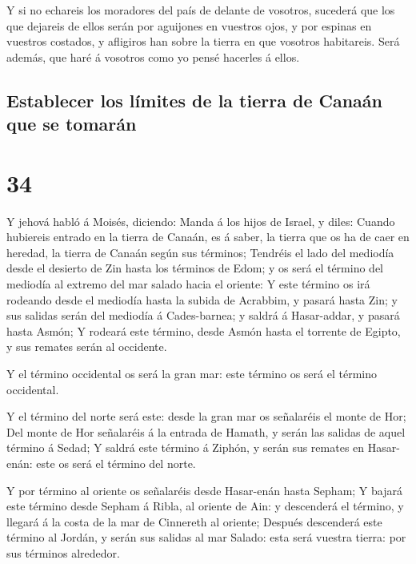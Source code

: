  Y si no echareis los moradores del país de delante de
vosotros, sucederá que los que dejareis de ellos serán por aguijones en
vuestros ojos, y por espinas en vuestros costados, y afligiros han sobre
la tierra en que vosotros habitareis.  Será además, que
haré á vosotros como yo pensé hacerles á ellos.

\hypertarget{establecer-los-luxedmites-de-la-tierra-de-canauxe1n-que-se-tomaruxe1n}{%
\subsection{Establecer los límites de la tierra de Canaán que se
tomarán}\label{establecer-los-luxedmites-de-la-tierra-de-canauxe1n-que-se-tomaruxe1n}}

\hypertarget{section-33}{%
\section{34}\label{section-33}}

 Y jehová habló á Moisés, diciendo:  Manda á los
hijos de Israel, y diles: Cuando hubiereis entrado en la tierra de
Canaán, es á saber, la tierra que os ha de caer en heredad, la tierra de
Canaán según sus términos;  Tendréis el lado del mediodía
desde el desierto de Zin hasta los términos de Edom; y os será el
término del mediodía al extremo del mar salado hacia el oriente:
 Y este término os irá rodeando desde el mediodía hasta la
subida de Acrabbim, y pasará hasta Zin; y sus salidas serán del mediodía
á Cades-barnea; y saldrá á Hasar-addar, y pasará hasta Asmón;
 Y rodeará este término, desde Asmón hasta el torrente de
Egipto, y sus remates serán al occidente.

 Y el término occidental os será la gran mar: este término
os será el término occidental.

 Y el término del norte será este: desde la gran mar os
señalaréis el monte de Hor;  Del monte de Hor señalaréis á
la entrada de Hamath, y serán las salidas de aquel término á Sedad;
 Y saldrá este término á Ziphón, y serán sus remates en
Hasar-enán: este os será el término del norte.

 Y por término al oriente os señalaréis desde Hasar-enán
hasta Sepham;  Y bajará este término desde Sepham á Ribla,
al oriente de Ain: y descenderá el término, y llegará á la costa de la
mar de Cinnereth al oriente;  Después descenderá este
término al Jordán, y serán sus salidas al mar Salado: esta será vuestra
tierra: por sus términos alrededor.

